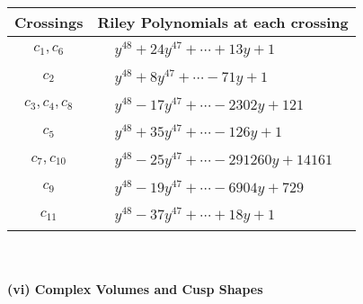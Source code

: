 \documentclass[1p]{elsarticle_modified}
\theoremstyle{definition}
\begin{document}
\begin{tabular}{m{50pt}|m{274pt}}
Crossings & \hspace{64pt}Riley Polynomials at each crossing \\
\hline $$\begin{aligned}c_{1},c_{6}\end{aligned}$$&$\begin{aligned}
&y^{48}+24 y^{47}+\cdots+13 y+1
\end{aligned}$\\
\hline $$\begin{aligned}c_{2}\end{aligned}$$&$\begin{aligned}
&y^{48}+8 y^{47}+\cdots-71 y+1
\end{aligned}$\\
\hline $$\begin{aligned}c_{3},c_{4},c_{8}\end{aligned}$$&$\begin{aligned}
&y^{48}-17 y^{47}+\cdots-2302 y+121
\end{aligned}$\\
\hline $$\begin{aligned}c_{5}\end{aligned}$$&$\begin{aligned}
&y^{48}+35 y^{47}+\cdots-126 y+1
\end{aligned}$\\
\hline $$\begin{aligned}c_{7},c_{10}\end{aligned}$$&$\begin{aligned}
&y^{48}-25 y^{47}+\cdots-291260 y+14161
\end{aligned}$\\
\hline $$\begin{aligned}c_{9}\end{aligned}$$&$\begin{aligned}
&y^{48}-19 y^{47}+\cdots-6904 y+729
\end{aligned}$\\
\hline $$\begin{aligned}c_{11}\end{aligned}$$&$\begin{aligned}
&y^{48}-37 y^{47}+\cdots+18 y+1
\end{aligned}$\\
\hline
\end{tabular}\\~\\
\newpage\flushleft \textbf{(vi) Complex Volumes and Cusp Shapes}
\end{document}
